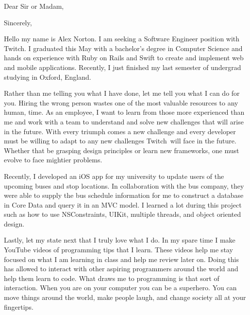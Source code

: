 \documentclass{my_cv}
\begin{document}
\newcommand{\companyName}{Twitch} %
\newcommand{\jobTitle}{Software Engineer }
\recipient{\companyName \ Recruitment team}{\companyName }
\date{\today}
\opening{Dear Sir or Madam,}
\closing{Sincerely,}
\makelettertitle


\indent Hello my name is Alex Norton.  I am seeking a \jobTitle
position with \companyName .  I graduated this May with a bachelor’s degree in
Computer Science and hands on experience with Ruby on Rails and Swift to create and
implement web and mobile applications.  Recently, I just finished my last
semester of undergrad studying in Oxford, England. 

Rather than me telling you what I have done, let me tell you what I can do for
you.  Hiring the wrong person wastes one of the most valuable resources to any
human, time.  As an employee, I want to learn from those more experienced 
than me and work with a team to understand and solve new challenges that will 
arise in the future.  With every triumph comes a new challenge and every 
developer must be willing to adapt to any new challenges \companyName \ will 
face in the future.  Whether that be grasping design principles or
learn new frameworks, one must evolve to face mightier problems.

Recently, I developed an iOS app for my university to update users of the
upcoming buses and stop locations.  In collaboration with the bus company, they
were able to supply the bus schedule information for me to construct a
database in Core Data and query it in an MVC model.  I learned a lot during this
project such as how to use NSConstraints, UIKit, multiple threads, and object
oriented design.

Lastly, let my state next that I truly love what I do.  In my spare time
I make YouTube videos of programming tips that I learn.  These videos
help me stay focused on what I am learning in class and help me review
later on.  Doing this has allowed to interact with other aspiring
programmers around the world and help them learn to code.  What draws me
to programming is that sort of interaction.  When you are on your
computer you can be a superhero.  You can move things around the world,
make people laugh, and change society all at your fingertips.
\end{document}

